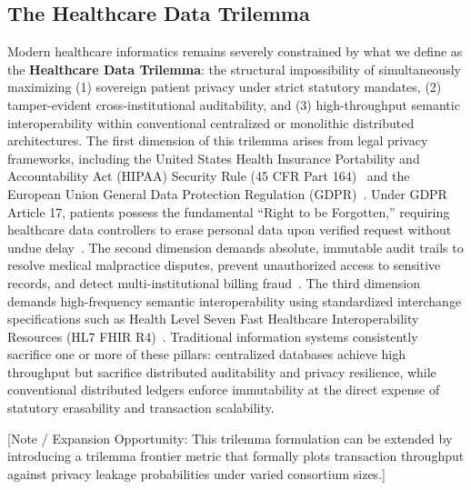 \subsection{The Healthcare Data Trilemma}
Modern healthcare informatics remains severely constrained by what we define as the \textbf{Healthcare Data Trilemma}: the structural impossibility of simultaneously maximizing (1) sovereign patient privacy under strict statutory mandates, (2) tamper-evident cross-institutional auditability, and (3) high-throughput semantic interoperability within conventional centralized or monolithic distributed architectures. The first dimension of this trilemma arises from legal privacy frameworks, including the United States Health Insurance Portability and Accountability Act (HIPAA) Security Rule (45 CFR Part 164)~\cite{hipaa1996} and the European Union General Data Protection Regulation (GDPR)~\cite{gdpr2016}. Under GDPR Article 17, patients possess the fundamental ``Right to be Forgotten,'' requiring healthcare data controllers to erase personal data upon verified request without undue delay~\cite{politou2018forgetting}. The second dimension demands absolute, immutable audit trails to resolve medical malpractice disputes, prevent unauthorized access to sensitive records, and detect multi-institutional billing fraud~\cite{esposito2018blockchain}. The third dimension demands high-frequency semantic interoperability using standardized interchange specifications such as Health Level Seven Fast Healthcare Interoperability Resources (HL7 FHIR R4)~\cite{hl7fhir, zhang2018fhirchain}. Traditional information systems consistently sacrifice one or more of these pillars: centralized databases achieve high throughput but sacrifice distributed auditability and privacy resilience, while conventional distributed ledgers enforce immutability at the direct expense of statutory erasability and transaction scalability.

[Note / Expansion Opportunity: This trilemma formulation can be extended by introducing a trilemma frontier metric that formally plots transaction throughput against privacy leakage probabilities under varied consortium sizes.]

